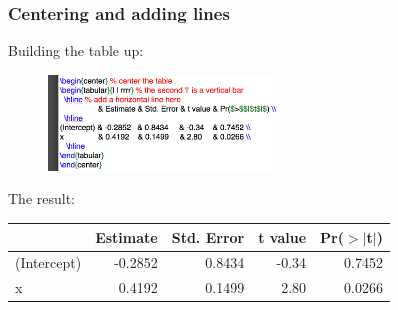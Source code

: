 \documentclass[slidestop,compress,mathserif]{beamer}
\begin{document}
\begin{frame} \frametitle{Centering and adding lines}
	Building the table up:
	\begin{figure}[htbp]
		\centering
		\includegraphics[height=1.0in]{basicsOfLatex/tabTable/centeredTable}
	\end{figure}
	The result: \\
	\vspace{0.3cm}
	\begin{center} %
		\begin{tabular}{l | rrrr} %
			\hline %
			& Estimate & Std. Error & t value & Pr($>$$|$t$|$) \\
			\hline
			(Intercept) & -0.2852   & 0.8434     & -0.34    & 0.7452 \\
			x                & 0.4192    & 0.1499     & 2.80     & 0.0266 \\
			\hline
		\end{tabular}
	\end{center}
\end{frame}
\end{document}

